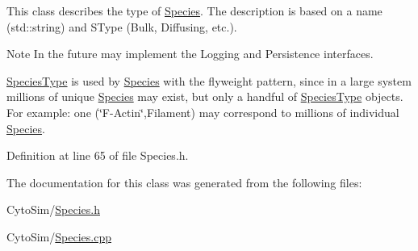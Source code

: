 This class describes the type of \hyperlink{classSpecies}{Species}. The description is based on a name (std\-::string) and S\-Type (Bulk, Diffusing, etc.). \begin{DoxyNote}{Note}
In the future may implement the Logging and Persistence interfaces. 

\hyperlink{classSpeciesType}{Species\-Type} is used by \hyperlink{classSpecies}{Species} with the flyweight pattern, since in a large system millions of unique \hyperlink{classSpecies}{Species} may exist, but only a handful of \hyperlink{classSpeciesType}{Species\-Type} objects. For example\-: one (\char`\"{}\-F-\/\-Actin\char`\"{},Filament) may correspond to millions of individual \hyperlink{classSpecies}{Species}. 
\end{DoxyNote}


Definition at line 65 of file Species.\-h.



The documentation for this class was generated from the following files\-:\begin{DoxyCompactItemize}
\item 
Cyto\-Sim/\hyperlink{Species_8h}{Species.\-h}\item 
Cyto\-Sim/\hyperlink{Species_8cpp}{Species.\-cpp}\end{DoxyCompactItemize}
